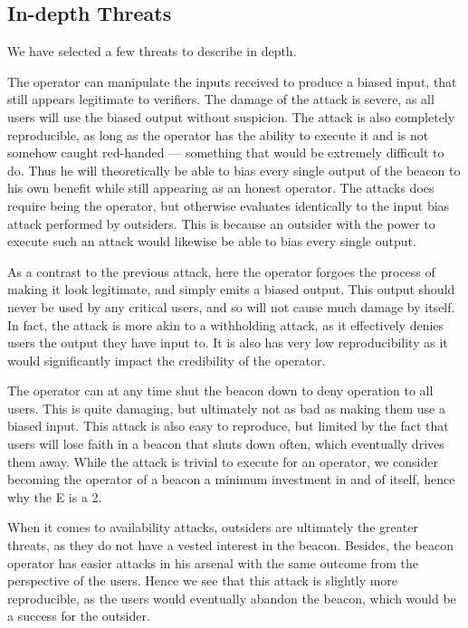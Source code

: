 \subsection{In-depth Threats}
We have selected a few threats to describe in depth. 

The operator can manipulate the inputs received to produce a biased input, that still appears legitimate to verifiers. The damage of the attack is severe, as all users will use the biased output without suspicion. The attack is also completely reproducible, as long as the operator has the ability to execute it and is not somehow caught red-handed --- something that would be extremely difficult to do. Thus he will theoretically be able to bias every single output of the beacon to his own benefit while still appearing as an honest operator. The attacks does require being the operator, but otherwise evaluates identically to the input bias attack performed by outsiders. This is because an outsider with the power to execute such an attack would likewise be able to bias every single output.

As a contrast to the previous attack, here the operator forgoes the process of making it look legitimate, and simply emits a biased output. This output should never be used by any critical users, and so will not cause much damage by itself. In fact, the attack is more akin to a withholding attack, as it effectively denies users the output they have input to. It is also has very low reproducibility as it would significantly impact the credibility of the operator.

The operator can at any time shut the beacon down to deny operation to all users. This is quite damaging, but ultimately not as bad as making them use a biased input. This attack is also easy to reproduce, but limited by the fact that users will lose faith in a beacon that shuts down often, which eventually drives them away. While the attack is trivial to execute for an operator, we consider becoming the operator of a beacon a minimum investment in and of itself, hence why the E is a 2.

When it comes to availability attacks, outsiders are ultimately the greater threats, as they do not have a vested interest in the beacon. Besides, the beacon operator has easier attacks in his arsenal with the same outcome from the perspective of the users. Hence we see that this attack is slightly more reproducible, as the users would eventually abandon the beacon, which would be a success for the outsider.